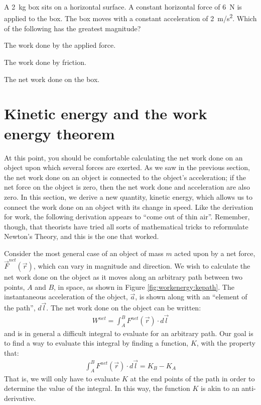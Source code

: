 \begin{checkpoint}
\begin{MCquestion}{A \SI{2}{kg} box sits on a horizontal surface. A constant horizontal force of \SI{6}{N} is applied to the box. The box moves with a constant acceleration of \SI{2}{m/s^2}. Which of the following has the greatest magnitude?}
\item The work done by the applied force. %
\item The work done by friction.
\item The net work done on the box.
\end{MCquestion}
\end{checkpoint}

\section{Kinetic energy and the work energy theorem}
At this point, you should be comfortable calculating the net work done on an object upon which several forces are exerted. As we saw in the previous section, the net work done on an object is connected to the object's acceleration; if the net force on the object is zero, then the net work done and acceleration are also zero. In this section, we derive a new quantity, kinetic energy, which allows us to connect the work done on an object with its change in speed. Like the derivation for work, the following derivation appears to ``come out of thin air''. Remember, though, that theorists have tried all sorts of mathematical tricks to reformulate Newton's Theory, and this is the one that worked.

Consider the most general case of an object of mass $m$ acted upon by a net force, $\vec F^{net}(\vec r)$, which can vary in magnitude and direction. We wish to calculate the  net work done on the object as it moves along an arbitrary path between two points, $A$ and $B$, in space, as shown in Figure \ref{fig:workenergy:kepath}. The instantaneous acceleration of the object, $\vec a$, is shown along with an ``element of the path'', $d\vec l$. 
The net work done on the object can be written:
\begin{align*}
W^{net} = \int_A^B F^{net}(\vec r) \cdot d\vec l
\end{align*} 
and is in general a difficult integral to evaluate for an arbitrary path. Our goal is to find a way to evaluate this integral by finding a function, $K$, with the property that:
\begin{align*}
\int_A^B F^{net}(\vec r) \cdot d\vec l =K_B - K_A
\end{align*}
That is, we will only have to evaluate $K$ at the end points of the path in order to determine the value of the integral. In this way, the function $K$ is akin to an anti-derivative.  

